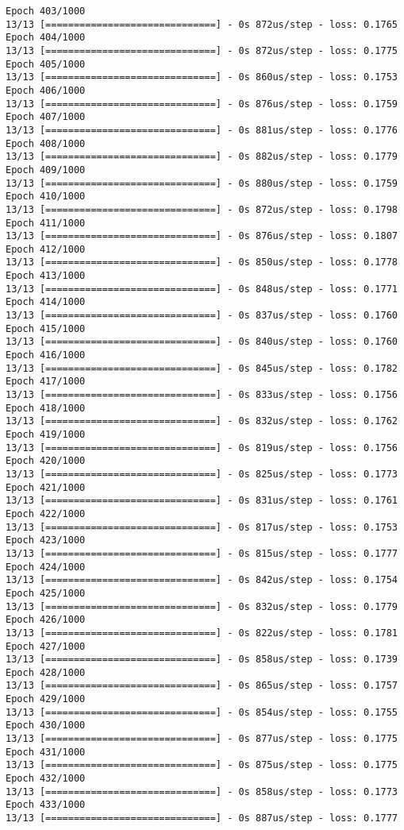 \documentclass[11pt]{article}
\begin{document}
\begin{Verbatim}[commandchars=\\\{\}]
Epoch 403/1000
13/13 [==============================] - 0s 872us/step - loss: 0.1765
Epoch 404/1000
13/13 [==============================] - 0s 872us/step - loss: 0.1775
Epoch 405/1000
13/13 [==============================] - 0s 860us/step - loss: 0.1753
Epoch 406/1000
13/13 [==============================] - 0s 876us/step - loss: 0.1759
Epoch 407/1000
13/13 [==============================] - 0s 881us/step - loss: 0.1776
Epoch 408/1000
13/13 [==============================] - 0s 882us/step - loss: 0.1779
Epoch 409/1000
13/13 [==============================] - 0s 880us/step - loss: 0.1759
Epoch 410/1000
13/13 [==============================] - 0s 872us/step - loss: 0.1798
Epoch 411/1000
13/13 [==============================] - 0s 876us/step - loss: 0.1807
Epoch 412/1000
13/13 [==============================] - 0s 850us/step - loss: 0.1778
Epoch 413/1000
13/13 [==============================] - 0s 848us/step - loss: 0.1771
Epoch 414/1000
13/13 [==============================] - 0s 837us/step - loss: 0.1760
Epoch 415/1000
13/13 [==============================] - 0s 840us/step - loss: 0.1760
Epoch 416/1000
13/13 [==============================] - 0s 845us/step - loss: 0.1782
Epoch 417/1000
13/13 [==============================] - 0s 833us/step - loss: 0.1756
Epoch 418/1000
13/13 [==============================] - 0s 832us/step - loss: 0.1762
Epoch 419/1000
13/13 [==============================] - 0s 819us/step - loss: 0.1756
Epoch 420/1000
13/13 [==============================] - 0s 825us/step - loss: 0.1773
Epoch 421/1000
13/13 [==============================] - 0s 831us/step - loss: 0.1761
Epoch 422/1000
13/13 [==============================] - 0s 817us/step - loss: 0.1753
Epoch 423/1000
13/13 [==============================] - 0s 815us/step - loss: 0.1777
Epoch 424/1000
13/13 [==============================] - 0s 842us/step - loss: 0.1754
Epoch 425/1000
13/13 [==============================] - 0s 832us/step - loss: 0.1779
Epoch 426/1000
13/13 [==============================] - 0s 822us/step - loss: 0.1781
Epoch 427/1000
13/13 [==============================] - 0s 858us/step - loss: 0.1739
Epoch 428/1000
13/13 [==============================] - 0s 865us/step - loss: 0.1757
Epoch 429/1000
13/13 [==============================] - 0s 854us/step - loss: 0.1755
Epoch 430/1000
13/13 [==============================] - 0s 877us/step - loss: 0.1775
Epoch 431/1000
13/13 [==============================] - 0s 875us/step - loss: 0.1775
Epoch 432/1000
13/13 [==============================] - 0s 858us/step - loss: 0.1773
Epoch 433/1000
13/13 [==============================] - 0s 887us/step - loss: 0.1777

\end{Verbatim}
\end{document}

